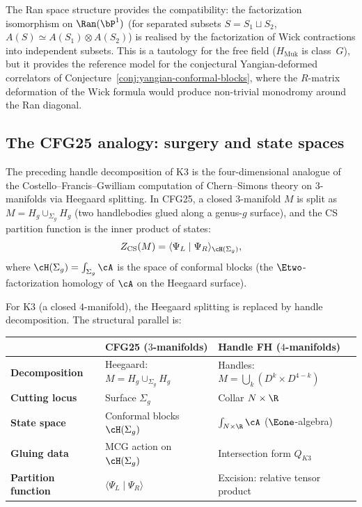 \begin{remark}
The Ran space structure provides the compatibility: the factorization isomorphism on $\Ran(\bP^1)$ (for separated subsets $S = S_1 \sqcup S_2$, $A(S) \simeq A(S_1) \otimes A(S_2)$) is realised by the factorization of Wick contractions into independent subsets. This is a tautology for the free field ($H_{\mathrm{Muk}}$ is class~$G$), but it provides the reference model for the conjectural Yangian-deformed correlators of Conjecture~\ref{conj:yangian-conformal-blocks}, where the $R$-matrix deformation of the Wick formula would produce non-trivial monodromy around the Ran diagonal.
\end{remark}


\subsection{The CFG25 analogy: surgery and state spaces}
\label{subsec:cfg25-analogy}

The preceding handle decomposition of K3 is the four-dimensional analogue of the Costello--Francis--Gwilliam computation of Chern--Simons theory on $3$-manifolds via Heegaard splitting. In CFG25, a closed $3$-manifold $M$ is split as $M = H_g \cup_{\Sigma_g} H_g$ (two handlebodies glued along a genus-$g$ surface), and the CS partition function is the inner product of states:
\[
 Z_{\mathrm{CS}}(M) = \langle \Psi_L \mid \Psi_R \rangle_{\cH(\Sigma_g)},
\]
where $\cH(\Sigma_g) = \int_{\Sigma_g} \cA$ is the space of conformal blocks (the $\Etwo$-factorization homology of $\cA$ on the Heegaard surface).

For K3 (a closed $4$-manifold), the Heegaard splitting is replaced by handle decomposition. The structural parallel is:

\begin{center}
\renewcommand{\arraystretch}{1.3}
\small
\begin{tabular}{lll}
 \toprule
 & \textbf{CFG25 ($3$-manifolds)} & \textbf{Handle FH ($4$-manifolds)} \\
 \midrule
 \textbf{Decomposition} & Heegaard: $M = H_g \cup_{\Sigma_g} H_g$ & Handles: $M = \bigcup_k (D^k \times D^{4-k})$ \\
 \textbf{Cutting locus} & Surface $\Sigma_g$ & Collar $N \times \R$ \\
 \textbf{State space} & Conformal blocks $\cH(\Sigma_g)$ & $\int_{N \times \R} \cA$ ($\Eone$-algebra) \\
 \textbf{Gluing data} & MCG action on $\cH(\Sigma_g)$ & Intersection form $Q_{K3}$ \\
 \textbf{Partition function} & $\langle \Psi_L \mid \Psi_R \rangle$ & Excision: relative tensor product \\
 \bottomrule
\end{tabular}
\end{center}

